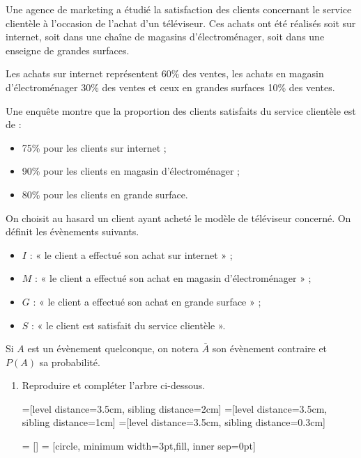 \documentclass[11pt,fleqn, openany]{book} %
\begin{document}
\begin{exercise}[subtitle={(Métropole 2024, Jour 1)}]
Une agence de marketing a étudié la satisfaction des clients concernant le service clientèle à l'occasion de l'achat d'un téléviseur. Ces achats ont été réalisés soit sur internet, soit dans une chaîne de magasins d'électroménager, soit dans une enseigne de grandes surfaces.

Les achats sur internet représentent 60\% des ventes, les achats en magasin d'électroménager 30\% des ventes et ceux en grandes surfaces 10\% des ventes.

Une enquête montre que la proportion des clients satisfaits du service clientèle est de :
\begin{itemize}
\item 75\% pour les clients sur internet ;
\item 90\% pour les clients en magasin d'électroménager ;
\item 80\% pour les clients en grande surface.
\end{itemize}
On choisit au hasard un client ayant acheté le modèle de téléviseur concerné. On définit les évènements suivants.
\begin{itemize}
\item $I$ : « le client a effectué son achat sur internet » ;
\item $M$ : « le client a effectué son achat en magasin d'électroménager » ;
\item $G$ : « le client a effectué son achat en grande surface » ;
\item $S$ : « le client est satisfait du service clientèle ».
\end{itemize}

Si $A$ est un évènement quelconque, on notera $\overline{A}$ son évènement contraire et $P(A)$ sa probabilité.
\begin{enumerate}
\item Reproduire et compléter l'arbre ci-dessous.

=[level distance=3.5cm, sibling distance=2cm]
=[level distance=3.5cm, sibling distance=1cm]
=[level distance=3.5cm, sibling distance=0.3cm]

 = []
 = [circle, minimum width=3pt,fill, inner sep=0pt]


\end{enumerate}
\end{exercise}
\end{document}

